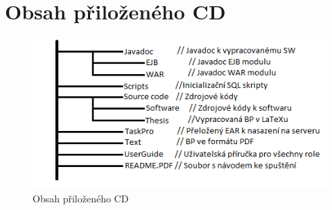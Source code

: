 \documentclass[11pt,twoside,a4paper]{book}
\begin{document}

\chapter{Obsah přiloženého CD}

\begin{figure}[h!]
\begin{center}
\includegraphics{images/cdContent}
\caption{Obsah přiloženého CD}  
\label{img:cd}
\end{center}
\end{figure}
\end{document}
